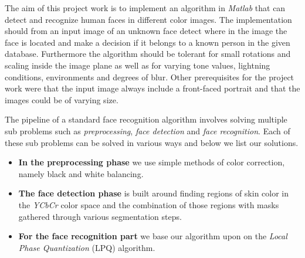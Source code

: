The aim of this project work is to implement an algorithm in \textit{Matlab} that can detect and recognize human faces in different color images. The implementation should from an input image of an unknown face detect where in the image the face is located and make a decision if it belongs to a known person in the given database. Furthermore the algorithm should be tolerant for small rotations and scaling inside the image plane as well as for varying tone values, lightning conditions, environments and degrees of blur. Other prerequisites for the project work were that the input image always include a front-faced portrait and that the images could be of varying size.

The pipeline of a standard face recognition algorithm involves solving multiple sub problems such as \textit{preprocessing}, \textit{face detection} and \textit{face recognition}. Each of these sub problems can be solved in various ways and below we list our solutions.

\begin{itemize}
  \item \textbf{In the preprocessing phase} we use simple methods of color correction, namely black and white balancing. 
  \item \textbf{The face detection phase} is built around finding regions of skin color in the \textit{YCbCr} color space and the combination of those regions with masks gathered through various segmentation steps. 
  \item \textbf{For the face recognition part} we base our algorithm upon on the \textit{Local Phase Quantization} (LPQ) algorithm. 

\end{itemize}
